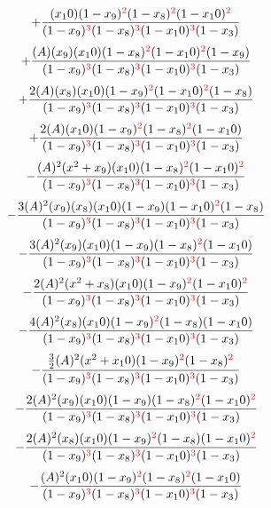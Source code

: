 \documentclass{article}
\begin{document}
\[+\frac{(x_10)(1-x_9)^{\textcolor{red}{2}}(1-x_8)^{\textcolor{red}{2}}(1-x_10)^{\textcolor{red}{2}}}{(1-x_9)^{\textcolor{red}{3}}(1-x_8)^{\textcolor{red}{3}}(1-x_10)^{\textcolor{red}{3}}(1-x_3)}\]\[+\frac{(A)(x_9)(x_10)(1-x_8)^{\textcolor{red}{2}}(1-x_10)^{\textcolor{red}{2}}(1-x_9)}{(1-x_9)^{\textcolor{red}{3}}(1-x_8)^{\textcolor{red}{3}}(1-x_10)^{\textcolor{red}{3}}(1-x_3)}\]\[+\frac{2(A)(x_8)(x_10)(1-x_9)^{\textcolor{red}{2}}(1-x_10)^{\textcolor{red}{2}}(1-x_8)}{(1-x_9)^{\textcolor{red}{3}}(1-x_8)^{\textcolor{red}{3}}(1-x_10)^{\textcolor{red}{3}}(1-x_3)}\]\[+\frac{2(A)(x_10)(1-x_9)^{\textcolor{red}{2}}(1-x_8)^{\textcolor{red}{2}}(1-x_10)}{(1-x_9)^{\textcolor{red}{3}}(1-x_8)^{\textcolor{red}{3}}(1-x_10)^{\textcolor{red}{3}}(1-x_3)}\]\[-\frac{(A)^{2}(x^{2}+x_9)(x_10)(1-x_8)^{\textcolor{red}{2}}(1-x_10)^{\textcolor{red}{2}}}{(1-x_9)^{\textcolor{red}{3}}(1-x_8)^{\textcolor{red}{3}}(1-x_10)^{\textcolor{red}{3}}(1-x_3)}\]\[-\frac{3(A)^{2}(x_9)(x_8)(x_10)(1-x_9)(1-x_10)^{\textcolor{red}{2}}(1-x_8)}{(1-x_9)^{\textcolor{red}{3}}(1-x_8)^{\textcolor{red}{3}}(1-x_10)^{\textcolor{red}{3}}(1-x_3)}\]\[-\frac{3(A)^{2}(x_9)(x_10)(1-x_9)(1-x_8)^{\textcolor{red}{2}}(1-x_10)}{(1-x_9)^{\textcolor{red}{3}}(1-x_8)^{\textcolor{red}{3}}(1-x_10)^{\textcolor{red}{3}}(1-x_3)}\]\[-\frac{2(A)^{2}(x^{2}+x_8)(x_10)(1-x_9)^{\textcolor{red}{2}}(1-x_10)^{\textcolor{red}{2}}}{(1-x_9)^{\textcolor{red}{3}}(1-x_8)^{\textcolor{red}{3}}(1-x_10)^{\textcolor{red}{3}}(1-x_3)}\]\[-\frac{4(A)^{2}(x_8)(x_10)(1-x_9)^{\textcolor{red}{2}}(1-x_8)(1-x_10)}{(1-x_9)^{\textcolor{red}{3}}(1-x_8)^{\textcolor{red}{3}}(1-x_10)^{\textcolor{red}{3}}(1-x_3)}\]\[-\frac{\frac{3}{2}(A)^{2}(x^{2}+x_10)(1-x_9)^{\textcolor{red}{2}}(1-x_8)^{\textcolor{red}{2}}}{(1-x_9)^{\textcolor{red}{3}}(1-x_8)^{\textcolor{red}{3}}(1-x_10)^{\textcolor{red}{3}}(1-x_3)}\]\[-\frac{2(A)^{2}(x_9)(x_10)(1-x_9)(1-x_8)^{\textcolor{red}{2}}(1-x_10)^{\textcolor{red}{2}}}{(1-x_9)^{\textcolor{red}{3}}(1-x_8)^{\textcolor{red}{3}}(1-x_10)^{\textcolor{red}{3}}(1-x_3)}\]\[-\frac{2(A)^{2}(x_8)(x_10)(1-x_9)^{\textcolor{red}{2}}(1-x_8)(1-x_10)^{\textcolor{red}{2}}}{(1-x_9)^{\textcolor{red}{3}}(1-x_8)^{\textcolor{red}{3}}(1-x_10)^{\textcolor{red}{3}}(1-x_3)}\]\[-\frac{(A)^{2}(x_10)(1-x_9)^{\textcolor{red}{2}}(1-x_8)^{\textcolor{red}{2}}(1-x_10)}{(1-x_9)^{\textcolor{red}{3}}(1-x_8)^{\textcolor{red}{3}}(1-x_10)^{\textcolor{red}{3}}(1-x_3)}\]
\end{document}
